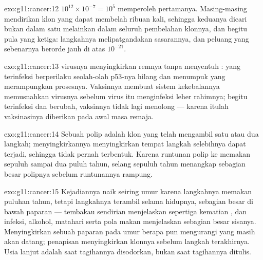\begin{solution}{exo:g11:cancer:12}
$10^{12} \times 10^{-7} = 10^5$  memperoleh  pertamanya.
Masing-masing mendirikan klon yang dapat membelah ribuan kali, sehingga
 keduanya dicari bukan dalam satu  melainkan dalam seluruh
pembelahan klonnya, dan begitu pula yang ketiga: langkahnya
melipatgandakan sasarannya, dan peluang yang sebenarnya berorde jauh di
atas $10^{-21}$.
\end{solution}

\begin{solution}{exo:g11:cancer:13}
 virusnya menyingkirkan remnya tanpa menyentuh :  yang
terinfeksi berperilaku seolah-olah p53-nya hilang dan menumpuk 
yang merampungkan prosesnya. Vaksinnya membuat sistem kekebalannya
memusnahkan virusnya sebelum virus itu menginfeksi leher rahimnya;
begitu  terinfeksi dan berubah, vaksinnya tidak lagi menolong ---
karena itulah vaksinasinya diberikan pada awal masa remaja.
\end{solution}

\begin{solution}{exo:g11:cancer:14}
Sebuah polip adalah klon yang telah mengambil satu atau dua langkah;
menyingkirkannya menyingkirkan  tempat langkah selebihnya dapat
terjadi, sehingga  tidak pernah terbentuk. Karena runtunan
polip ke  memakan sepuluh sampai dua puluh tahun, selang sepuluh
tahun menangkap sebagian besar polipnya sebelum runtunannya rampung.
\end{solution}

\begin{solution}{exo:g11:cancer:15}
Kejadiannya naik seiring umur karena langkahnya memakan puluhan tahun,
tetapi langkahnya terambil selama hidupnya, sebagian besar di bawah
paparan --- tembakau sendirian menjelaskan sepertiga kematian
, dan infeksi, alkohol, matahari serta pola makan menjelaskan
sebagian besar sisanya. Menyingkirkan sebuah paparan pada umur berapa
pun mengurangi  yang masih akan datang; penapisan menyingkirkan
klonnya sebelum langkah terakhirnya. Usia lanjut adalah saat tagihannya
disodorkan, bukan saat tagihannya ditulis.
\end{solution}

